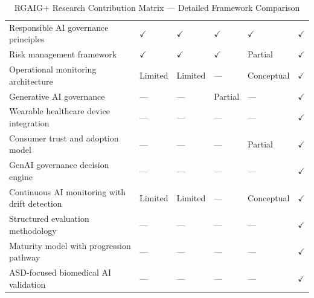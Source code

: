 \begingroup\singlespacing\tablefontsize\tablestripes
\begin{xltabular}{\textwidth}{@{} X >{\centering\arraybackslash}p{1.3cm} >{\centering\arraybackslash}p{1.3cm} >{\centering\arraybackslash}p{1.3cm} >{\centering\arraybackslash}p{1.3cm} >{\centering\arraybackslash}p{1.3cm} @{}}
\caption{RGAIG+ Research Contribution Matrix --- Detailed Framework Comparison}
\label{tab:rgaig_contribution_matrix}\\
\toprule
{} &  &  &  &  &  \\
\midrule
\endfirsthead
\endhead
\bottomrule
\endlastfoot
Responsible AI governance principles          & $\checkmark$ & $\checkmark$ & $\checkmark$ & $\checkmark$ & $\checkmark$ \\
\addlinespace
Risk management framework                     & $\checkmark$ & $\checkmark$ & $\checkmark$ & Partial      & $\checkmark$ \\
\addlinespace
Operational monitoring architecture            & Limited      & Limited      & ---          & Conceptual   & $\checkmark$ \\
\addlinespace
Generative AI governance                       & ---          & ---          & Partial      & ---          & $\checkmark$ \\
\addlinespace
Wearable healthcare device integration         & ---          & ---          & ---          & ---          & $\checkmark$ \\
\addlinespace
Consumer trust and adoption model              & ---          & ---          & ---          & Partial      & $\checkmark$ \\
\addlinespace
GenAI governance decision engine               & ---          & ---          & ---          & ---          & $\checkmark$ \\
\addlinespace
Continuous AI monitoring with drift detection  & Limited      & Limited      & ---          & Conceptual   & $\checkmark$ \\
\addlinespace
Structured evaluation methodology              & ---          & ---          & ---          & ---          & $\checkmark$ \\
\addlinespace
Maturity model with progression pathway        & ---          & ---          & ---          & ---          & $\checkmark$ \\
\addlinespace
ASD-focused biomedical AI validation          & ---          & ---          & ---          & ---          & $\checkmark$ \\

\end{xltabular}

